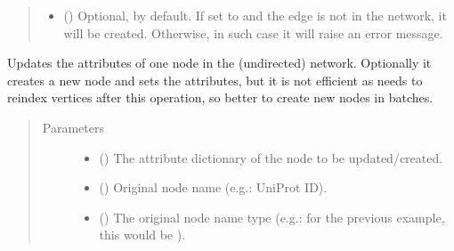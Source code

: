 \documentclass[letterpaper,10pt,english]{sphinxmanual}
\begin{document}
\begin{fulllineitems}
\begin{fulllineitems}
\begin{quote}
\begin{description}
\begin{itemize}
\item {} 
 () \textendash{} Optional,  by default. If set to  and the
edge is not in the network, it will be created. Otherwise,
in such case it will raise an error message.

\end{itemize}

\end{description}\end{quote}

\end{fulllineitems}


\begin{fulllineitems}
\label{\detokenize{reference:pypath.main.PyPath.add_update_vertex}}
Updates the attributes of one node in the (undirected) network.
Optionally it creates a new node and sets the attributes, but it
is not efficient as  needs to reindex vertices
after this operation, so better to create new nodes in batches.
\begin{quote}\begin{description}
\item[{Parameters}] \leavevmode\begin{itemize}
\item {} 
 () \textendash{} The attribute dictionary of the node to be updated/created.

\item {} 
 () \textendash{} Original node name (e.g.: UniProt ID).

\item {} 
 () \textendash{} The original node name type (e.g.: for the previous example,
this would be ).


\end{itemize}
\end{description}
\end{quote}
\end{fulllineitems}
\end{fulllineitems}
\end{document}
